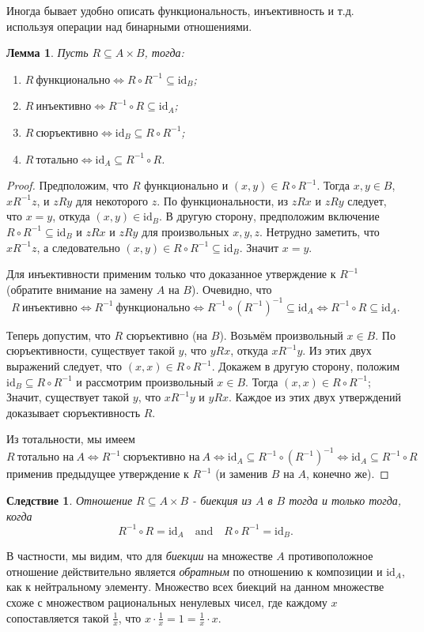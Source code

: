 \documentclass[12pt,notitlepage]{article}
\theoremstyle{plain}
\newtheorem{lemma}[thm]{Лемма}
\newtheorem{corr}[thm]{Следствие}
\theoremstyle{definition}
\theoremstyle{plain}
\newcommand{\sbs}{\subseteq}
\newcommand{\id}{\mathrm{id}}
\newcommand{\1}{\mathbf{1}}
\newcommand{\0}{\mathbf{0}}
\begin{document}
Иногда бывает удобно описать функциональность, инъективность и т.д.\, используя операции над бинарными отношениями.
\begin{lemma}\label{rel:fnc_algebra}
	Пусть $R \sbs A \times B$, тогда:
	\begin{enumerate}
		\item $R\ \mbox{функционально} \iff R \circ R^{-1} \sbs \id_B$;
		\item $R\ \mbox{инъективно} \iff R^{-1} \circ R \sbs \id_A$;
		\item $R\ \mbox{сюръективно} \iff \id_B \sbs R \circ R^{-1}$;
		\item $R\ \mbox{тотально} \iff \id_A \sbs R^{-1} \circ R$.
	\end{enumerate}
\end{lemma}
\begin{proof}
	Предположим, что $R$ функционально и $(x, y) \in R \circ R^{-1}$. Тогда $x, y \in B$, $x R^{-1} z$, и $z R y$ для некоторого $z$. По функциональности, из $z R x$ и $z R y$ следует, что $x = y$, откуда $(x, y) \in \id_B$. В другую сторону, предположим включение $R \circ R^{-1} \sbs \id_B$ и $z R x$ и $z R y$ для произвольных $x, y, z$. Нетрудно заметить, что $x R^{-1} z$, а следовательно $(x, y) \in R \circ R^{-1} \sbs \id_B$. Значит $x = y$.
	
	Для инъективности применим только что доказанное утверждение к $R^{-1}$ (обратите внимание на замену $A$ на $B$). Очевидно, что
	$$R\ \mbox{инъективно} \iff R^{-1}\ \mbox{функционально} \iff R^{-1} \circ (R^{-1})^{-1} \sbs \id_A \iff R^{-1} \circ R \sbs \id_A.$$
	
	Теперь допустим, что $R$ сюръективно (на $B$). Возьмём произвольный $x \in B$. По сюръективности, существует такой $y$, что $y R x$, откуда $x R^{-1} y$. Из этих двух выражений следует, что $(x, x) \in R  \circ R^{-1}$. Докажем в другую сторону, положим $\id_B \sbs R \circ R^{-1}$ и рассмотрим произвольный $x \in B$. Тогда $(x, x) \in R \circ R^{-1}$; Значит, существует такой $y$, что $x R^{-1} y$ и $y R x$. Каждое из этих двух утверждений доказывает сюръективность $R$.
	
	Из тотальности, мы имеем
	$$R\ \mbox{тотально на}\ A \iff R^{-1}\ \mbox{сюръективно на}\ A \iff \id_A \sbs R^{-1} \circ (R^{-1})^{-1} \iff \id_A \sbs R^{-1} \circ R$$
	применив предыдущее утверждение к $R^{-1}$ (и заменив $B$ на $A$, конечно же).
\end{proof}

\begin{corr}\label{ch0:bi_cmp}
	Отношение $R \sbs A \times B$ - биекция из $A$ в $B$ тогда и только тогда, когда
	$$R^{-1}\circ R = \id_A\quad \mbox{and}\quad R \circ R^{-1} = \id_B.$$
\end{corr}
В частности, мы видим, что для \emph{биекции} на множестве $A$ противоположное отношение действительно является \emph{обратным} по отношению к композиции и $\id_A$, как к нейтральному элементу. Множество всех биекций на данном множестве схоже с множеством рациональных ненулевых чисел, где каждому $x$ сопоставляется такой $\frac{1}{x}$, что $x \cdot \frac{1}{x} = 1 = \frac{1}{x} \cdot x$.
\end{document}
